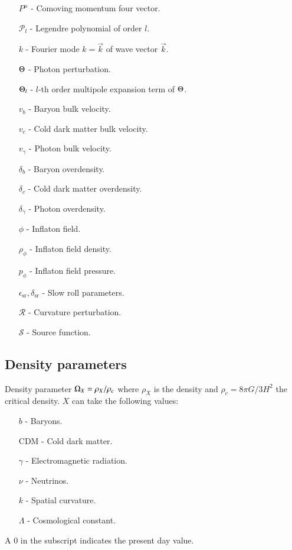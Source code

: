 \begin{itemize}
    \item[$P^\mu$]- Comoving momentum four vector.
    \item[$\mathcal{P}_l$] - Legendre polynomial of order $l$.
    \item[$k$] - Fourier mode $k=\vec{k}$ of wave vector $\vec{k}$. 
    \item[$\Theta$] - Photon perturbation.
    \item[$\Theta_l$] - $l$-th order multipole expansion term of $\Theta$.
    \item[$v_b$] - Baryon bulk velocity.
    \item[$v_c$] - Cold dark matter bulk velocity.
    \item[$v_\gamma$] - Photon bulk velocity. 
    \item[$\delta_b$] - Baryon overdensity.
    \item[$\delta_c$] - Cold dark matter overdensity.         
    \item[$\delta_\gamma$] - Photon overdensity.
    \item[$\phi$] - Inflaton field. 
    \item[$\rho_\phi$] - Inflaton field density.
    \item[$p_\phi$] - Inflaton field pressure.
    \item[$\epsilon_\mathrm{sr}, \delta_\mathrm{sr}$] - Slow roll parameters.  
    \item[$\mathcal{R}$] - Curvature perturbation.
    \item[$\mathcal{S}$] - Source function.  
\end{itemize}

\subsection*{Density parameters}
Density parameter $\Omega_X = \rho_X/\rho_c$ where $\rho_X$ is the density and $\rho_c=8\pi G/3H^2$ the critical density. $X$ can take the following values:
\begin{itemize}
    \item[$b$] - Baryons.
    \item[CDM] - Cold dark matter.
    \item[$\gamma$] - Electromagnetic radiation.
    \item[$\nu$] - Neutrinos.
    \item[$k$] - Spatial curvature.
    \item[$\Lambda$] - Cosmological constant.
\end{itemize}
A $0$ in the subscript indicates the present day value. 

